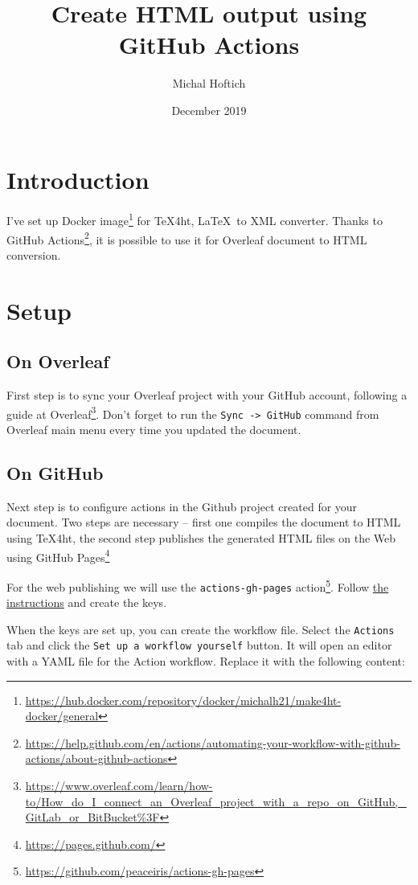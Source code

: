 \documentclass{article}
\title{Create HTML output using GitHub Actions}
\author{Michal Hoftich}
\date{December 2019}
\newcommand{\cmdname}[1]{\texttt{#1}}
\newcommand\footurl[1]{\footnote{\url{#1}}}
\begin{document}
\maketitle

\section{Introduction}

I've set up Docker image\footurl{https://hub.docker.com/repository/docker/michalh21/make4ht-docker/general} for \TeX4ht, \LaTeX\ to XML converter. Thanks to GitHub 
Actions\footurl{https://help.github.com/en/actions/automating-your-workflow-with-github-actions/about-github-actions}, it is possible to use it for Overleaf document to HTML conversion.

\section{Setup}

\subsection{On Overleaf}

First step is to sync your Overleaf project with your GitHub account, following a guide at Overleaf\footurl{https://www.overleaf.com/learn/how-to/How_do_I_connect_an_Overleaf_project_with_a_repo_on_GitHub,_GitLab_or_BitBucket\%3F}. Don't forget to run the \cmdname{Sync -> GitHub} command from Overleaf main menu every time you updated the document.

\subsection{On GitHub}
Next step is to configure actions in the Github project created for your document. Two steps are necessary -- first  one compiles the document to HTML using \TeX4ht, the second step publishes the generated HTML files on the Web using GitHub Pages\footurl{https://pages.github.com/}

For the web publishing we will use the \verb|actions-gh-pages| action\footurl{https://github.com/peaceiris/actions-gh-pages}. Follow \href{https://github.com/peaceiris/actions-gh-pages\#1-add-ssh-deploy-key}{the instructions} and create the keys.

When the keys are set up, you can create the workflow file. Select the \cmdname{Actions} tab and click the \cmdname{Set up a workflow yourself} button. It will open an editor with a YAML file for the Action workflow. Replace it with the following content:
\end{document}
